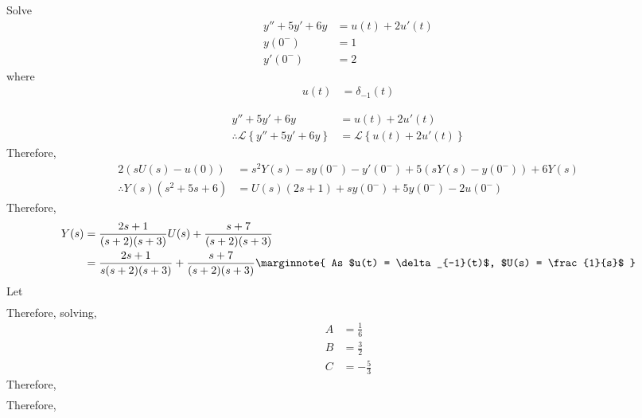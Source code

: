 \documentclass[fleqn, a4paper, 12pt, twoside]{article}
\theoremstyle{definition}
\theoremstyle{theorem}
\begin{document}
\begin{question}
	Solve
	\begin{align*}
		y'' + 5 y' + 6 y & = u(t) + 2 u'(t) \\
		y(0^-)           & = 1              \\
		y'(0^-)          & = 2
	\end{align*}
	where
	\begin{align*}
		u(t) & = \delta_{-1}(t)
	\end{align*}
\end{question}

\begin{solution}
	\begin{align*}
		y'' + 5 y' + 6 y                                        & = u(t) + 2 u'(t) \\
		\therefore \mathcal{L}\left\{ y'' + 5 y' + 6 y \right\} & = \mathcal{L}\left\{ u(t) + 2 u'(t) \right\}
	\end{align*}
	Therefore,
	\begin{align*}
		2 \left( s U(s) - u(0) \right)               & = s^2 Y(s) - s y(0^-) - y'(0^-) + 5 \left( s Y(s) - y(0^-) \right) + 6 Y(s) \\
		\therefore Y(s) \left( s^2 + 5 s + 6 \right) & = U(s) \left( 2 s + 1 \right) + s y(0^-) + 5 y(0^-) - 2 u(0^-)
	\end{align*}
	Therefore,
	\begin{align*}
		Y(s) & = \frac{2 s + 1}{(s + 2) (s + 3)} U(s) + \frac{s + 7}{(s + 2) (s + 3)} \\
                     & = \frac{2 s + 1}{s (s + 2) (s + 3)} + \frac{s + 7}{(s + 2) (s + 3)}
		\marginnote
		{
			As $u(t) = \delta_{-1}(t)$, $U(s) = \frac{1}{s}$
		}
	\end{align*}
	Let
	\begin{align*}
	\end{align*}
	Therefore, solving,
	\begin{align*}
		A & = \frac{1}{6} \\
		B & = \frac{3}{2} \\
		C & = -\frac{5}{3}
	\end{align*}
	Therefore,
	\begin{align*}
	\end{align*}
	Therefore,
	\begin{align*}
	\end{align*}
\end{solution}
\end{document}
